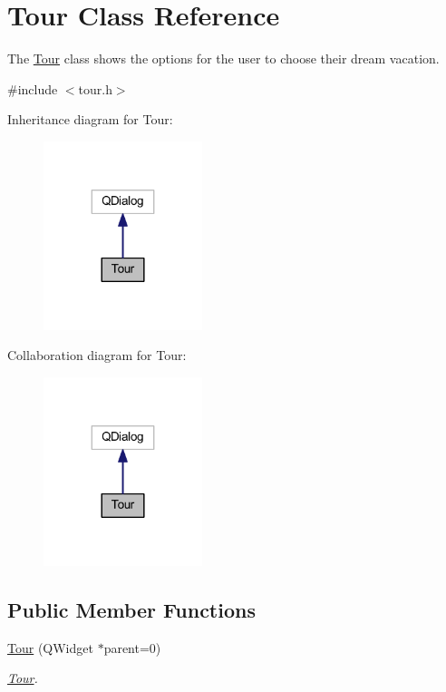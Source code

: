 \hypertarget{class_tour}{}\section{Tour Class Reference}
\label{class_tour}


The \hyperlink{class_tour}{Tour} class shows the options for the user to choose their dream vacation.  




{\ttfamily \#include $<$tour.\+h$>$}



Inheritance diagram for Tour\+:
\nopagebreak
\begin{figure}[H]
\begin{center}
\leavevmode
\includegraphics[width=131pt]{class_tour__inherit__graph}
\end{center}
\end{figure}


Collaboration diagram for Tour\+:
\nopagebreak
\begin{figure}[H]
\begin{center}
\leavevmode
\includegraphics[width=131pt]{class_tour__coll__graph}
\end{center}
\end{figure}
\subsection*{Public Member Functions}
\begin{DoxyCompactItemize}
\item 
\hyperlink{class_tour_af2f0737a5f0fac6b6bd564a999525ee1}{Tour} (Q\+Widget $\ast$parent=0)
\begin{DoxyCompactList}\small\item\em \hyperlink{class_tour}{Tour}. \end{DoxyCompactList}\end{DoxyCompactItemize}


